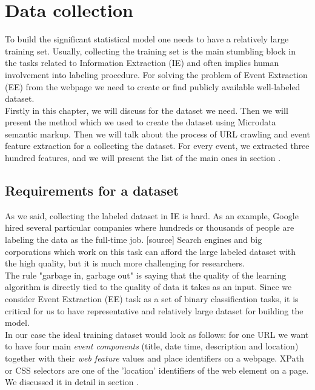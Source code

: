 \chapter{Data collection}
\label{chap:datacollect}
To build the significant statistical model one needs to have a relatively large training set. Usually, collecting the training set is the main stumbling block in the tasks related to Information Extraction (IE) and often implies human involvement into labeling procedure. For solving the problem of Event Extraction (EE) from the webpage we need to create or find publicly available well-labeled dataset.\\

Firstly in this chapter, we will discuss  for the dataset we need. Then we will present the method which we used to create the dataset using Microdata semantic markup. Then we will talk about the process of URL crawling and event feature extraction for a collecting the dataset. For every event, we extracted three hundred features, and we will present the list of the main ones in section .

\section{Requirements for a dataset}

As we said, collecting the labeled dataset in IE is hard. As an example, Google hired several particular companies where hundreds or thousands of people are labeling the data as the full-time job. [source] Search engines and big corporations which work on this task can afford the large labeled dataset with the high quality, but it is much more challenging for researchers. \\

The rule "garbage in, garbage out" is saying that the quality of the learning algorithm is directly tied to the quality of data it takes as an input. Since we consider Event Extraction (EE) task as a set of binary classification tasks, it is critical for us to have representative and relatively large dataset for building the model.\\

In our case the ideal training dataset would look as follows: for one URL we want to have four main \textit{event components} (title, date time, description and location) together with their \textit{web feature} values and place identifiers on a webpage. XPath or CSS selectors are one of the 'location' identifiers of the web element on a page. We discussed it in detail in section .\\

